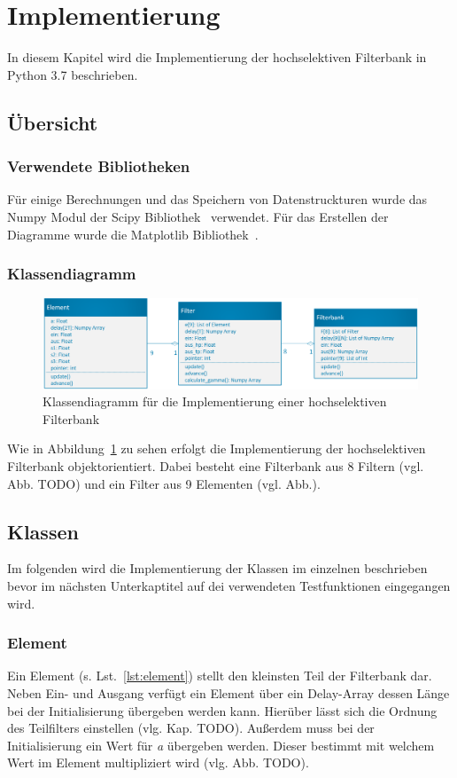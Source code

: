 \section{Implementierung}
In diesem Kapitel wird die Implementierung der hochselektiven Filterbank in Python 3.7 beschrieben.

\subsection{Übersicht}\label{sec:impl_ueber}

\subsubsection{Verwendete Bibliotheken}\label{sec:impl_bib}
Für einige Berechnungen und das Speichern von Datenstruckturen wurde das Numpy Modul der Scipy Bibliothek~\cite{scipy} verwendet. Für das Erstellen der Diagramme wurde die Matplotlib Bibliothek~\cite{Hunter:2007}.
\subsubsection{Klassendiagramm}\label{sec:impl_klass}
\begin{figure}
  \centering
  \includegraphics[width=1\textwidth]{img/klassendia}
  \caption{Klassendiagramm für die Implementierung einer hochselektiven Filterbank}\label{fig:impl_klassdia}
\end{figure}
Wie in Abbildung~\ref{fig:impl_klassdia} zu sehen erfolgt die Implementierung der hochselektiven Filterbank objektorientiert. Dabei besteht eine Filterbank aus 8 Filtern (vgl. Abb. TODO) und ein Filter aus 9 Elementen (vgl. Abb.).
\subsection{Klassen}\label{sec:impl_klassen}
Im folgenden wird die Implementierung der Klassen im einzelnen beschrieben bevor im nächsten Unterkaptitel auf dei verwendeten Testfunktionen eingegangen wird.
\subsubsection{Element}\label{sec:impl_ele}
Ein Element (s. Lst.~\ref{lst:element}) stellt den kleinsten Teil der Filterbank dar. Neben Ein- und Ausgang verfügt ein Element über ein Delay-Array dessen Länge bei der Initialisierung übergeben werden kann. Hierüber lässt sich die Ordnung des Teilfilters einstellen (vlg. Kap. TODO). Außerdem muss bei der Initialisierung ein Wert für \emph{a} übergeben werden. Dieser bestimmt mit welchem Wert im Element multipliziert wird (vlg. Abb. TODO).


